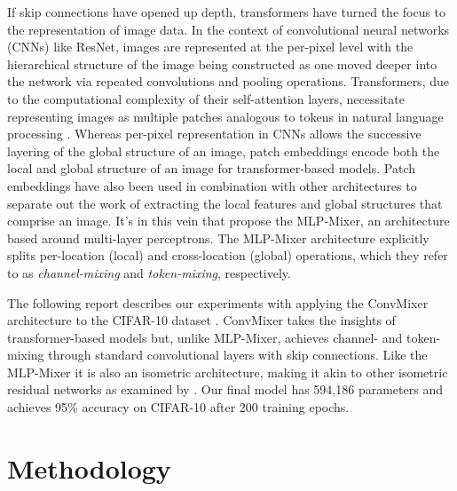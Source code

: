 \documentclass[letterpaper]{article} %
\begin{document}
If skip connections have opened up depth, transformers have turned the focus to the representation of image data. In the context of convolutional neural networks (CNNs) like ResNet, images are represented at the per-pixel level with the hierarchical structure of the image being constructed as one moved deeper into the network via repeated convolutions and pooling operations. Transformers, due to the computational complexity of their self-attention layers, necessitate representing images as multiple patches analogous to tokens in natural language processing \citep{Dosovitskiy2020}. Whereas per-pixel representation in CNNs allows the successive layering of the global structure of an image, patch embeddings encode both the local and global structure of an image for transformer-based models. Patch embeddings have also been used in combination with other architectures to separate out the work of extracting the local features and global structures that comprise an image. It's in this vein that \citet{Tolstikhin2021} propose the MLP-Mixer, an architecture based around multi-layer perceptrons. The MLP-Mixer architecture explicitly splits per-location (local) and cross-location (global) operations, which they refer to as \textit{channel-mixing} and \textit{token-mixing}, respectively. 

The following report describes our experiments with applying the ConvMixer architecture to the CIFAR-10 dataset \citep{Krizhevsky2009LearningML}. ConvMixer takes the insights of transformer-based models but, unlike MLP-Mixer, achieves channel- and token-mixing through standard convolutional layers with skip connections. Like the MLP-Mixer it is also an isometric architecture, making it akin to other isometric residual networks as examined by \citet{Sandler2019}. Our final model has 594,186 parameters and achieves 95\% accuracy on CIFAR-10 after 200 training epochs.

\section{Methodology}
\end{document}
